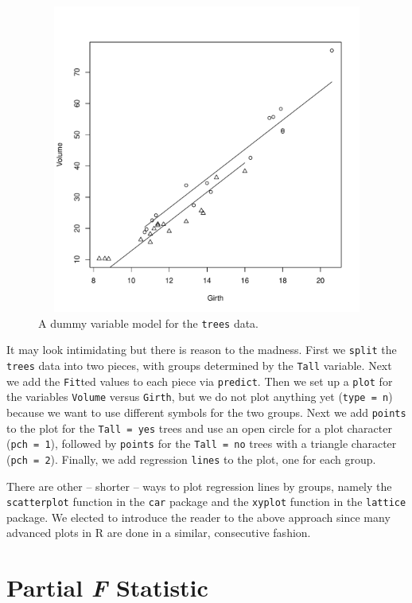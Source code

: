 \documentclass[captions=tableheading]{scrbook}
\begin{document}
\begin{figure}[th]
    \includegraphics[width=5in, height=4in]{img/dummy-variable-trees.pdf}
    \caption[A dummy variable model for the \texttt{trees} data]{\small A dummy variable model for the \texttt{trees} data.}
    \label{fig:dummy-variable-trees}
  \end{figure}

It may look intimidating but there is reason to the madness. First we \texttt{split} the \texttt{trees} data into two pieces, with groups determined by the \texttt{Tall} variable. Next we add the \texttt{Fit}ted values to each piece via \texttt{predict}. Then we set up a \texttt{plot} for the variables \texttt{Volume} versus \texttt{Girth}, but we do not plot anything yet (\texttt{type = n}) because we want to use different symbols for the two groups. Next we add \texttt{points} to the plot for the \texttt{Tall = yes} trees and use an open circle for a plot character (\texttt{pch = 1}), followed by \texttt{points} for the \texttt{Tall = no} trees with a triangle character (\texttt{pch = 2}). Finally, we add regression \texttt{lines} to the plot, one for each group.

There are other -- shorter -- ways to plot regression lines by groups, namely the \texttt{scatterplot} function in the \texttt{car} \cite{car} package and the \texttt{xyplot} function in the \texttt{lattice} package. We elected to introduce the reader to the above approach since many advanced plots in \textsf{R} are done in a similar, consecutive fashion.
\section{Partial \emph{F} Statistic}
\label{sec-12-7}
\end{document}

